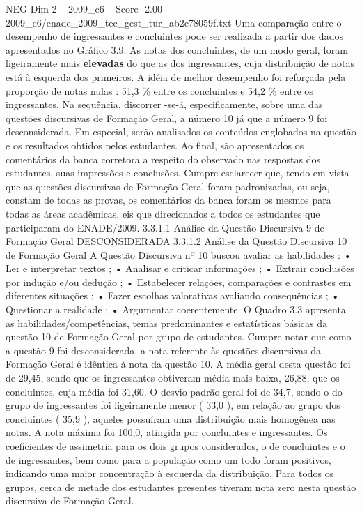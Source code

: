 \begin{textsample}{NEG Dim 2 – 2009\_c6 – Score -2.00 – 2009\_c6/enade\_2009\_tec\_gest\_tur\_ab2c78059f.txt}
Uma comparação entre o desempenho de ingressantes e concluintes pode ser realizada a partir dos dados apresentados no Gráfico 3.9.
As notas dos concluintes, de um modo geral, foram ligeiramente mais \textbf{elevadas} do que as dos ingressantes, cuja distribuição de notas está à esquerda dos primeiros.
A idéia de melhor desempenho foi reforçada pela proporção de notas nulas : 51,3 \% entre os concluintes e 54,2 \% entre os ingressantes.
Na sequência, discorrer -se-á, especificamente, sobre uma das questões discursivas de Formação Geral, a número 10 já que a número 9 foi desconsiderada.
Em especial, serão analisados os conteúdos englobados na questão e os resultados obtidos pelos estudantes.
Ao final, são apresentados os comentários da banca corretora a respeito do observado nas respostas dos estudantes, suas impressões e conclusões.
Cumpre esclarecer que, tendo em vista que as questões discursivas de Formação Geral foram padronizadas, ou seja, constam de todas as provas, os comentários da banca foram os mesmos para todas as áreas acadêmicas, eis que direcionados a todos os estudantes que participaram do ENADE/2009. 3.3.1.1 Análise da Questão Discursiva 9 de Formação Geral DESCONSIDERADA 3.3.1.2 Análise da Questão Discursiva 10 de Formação Geral A Questão Discursiva nº 10 buscou avaliar as habilidades : • Ler e interpretar textos ; • Analisar e criticar informações ; • Extrair conclusões por indução e/ou dedução ; • Estabelecer relações, comparações e contrastes em diferentes situações ; • Fazer escolhas valorativas avaliando consequências ; • Questionar a realidade ; • Argumentar coerentemente.
O Quadro 3.3 apresenta as habilidades/competências, temas predominantes e estatísticas básicas da questão 10 de Formação Geral por grupo de estudantes.
Cumpre notar que como a questão 9 foi desconsiderada, a nota referente às questões discursivas da Formação Geral é idêntica à nota da questão 10.
A média geral desta questão foi de 29,45, sendo que os ingressantes obtiveram média mais baixa, 26,88, que os concluintes, cuja média foi 31,60.
O desvio-padrão geral foi de 34,7, sendo o do grupo de ingressantes foi ligeiramente menor ( 33,0 ), em relação ao grupo dos concluintes ( 35,9 ), aqueles possuíram uma distribuição mais homogênea nas notas.
A nota máxima foi 100,0, atingida por concluintes e ingressantes.
Os coeficientes de assimetria para os dois grupos considerados, o de concluintes e o de ingressantes, bem como para a população como um todo foram positivos, indicando uma maior concentração à esquerda da distribuição.
Para todos os grupos, cerca de metade dos estudantes presentes tiveram nota zero nesta questão discursiva de Formação Geral.

\end{textsample}
